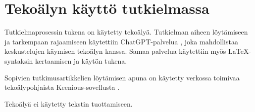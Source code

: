 \chapter*{Tekoälyn käyttö tutkielmassa}

Tutkielmaprosessin tukena on käytetty tekoälyä. Tutkielman aiheen löytämiseen ja tarkempaan rajaamiseen käytettiin ChatGPT-palvelua \citep{openai_chatgpt_2023}, joka mahdollistaa keskustelujen käymisen tekoälyn kanssa. Samaa palvelua käytettiin myös LaTeX-syntaksin kertaamisen ja käytön tukena.

Sopivien tutkimusartikkelien löytämisen apuna on käytetty verkossa toimivaa tekoälypohjaista Keenious-sovellusta \citep{keenious_keenious_2023}.

Tekoälyä ei käytetty tekstin tuottamiseen.
